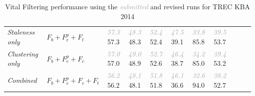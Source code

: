 \documentclass{article}
\newcommand{\sub}[1]{\textcolor{darkgray}{\sl #1}}
\begin{document}
\begin{table}[tb]
{\begin{center}
\begin{tabular}{llccccccccc}
{\textit{Staleness only}} & $F_b+F_e^p+F_t$ & 
  \sub{57.3} \hspace{1mm} 57.3 & \sub{48.3} \hspace{1mm} 48.3 & \sub{52.4} \hspace{1mm} 52.4 &
  \sub{47.5} \hspace{1mm} 39.1 & \sub{33.8} \hspace{1mm} 85.8 & \sub{39.5} \hspace{1mm} 53.7 \\
{\textit{Clustering only}} & $F_b+F_e^p+F_c$ & 
  \sub{57.0} \hspace{1mm} 57.0 & \sub{49.0} \hspace{1mm} 48.9 & \sub{52.7} \hspace{1mm} 52.6 &
  \sub{46.4} \hspace{1mm} 38.7 & \sub{34.2} \hspace{1mm} 85.0 & \sub{39.4} \hspace{1mm} 53.2 \\
{\textit{Combined}} & $F_b+F_e^p+F_c+F_t$ &
  \sub{56.2} \hspace{1mm} 56.2 & \sub{48.1} \hspace{1mm} 48.1 & \sub{51.8} \hspace{1mm} 51.8 &
  \sub{46.1} \hspace{1mm} 36.6 & \sub{32.6} \hspace{1mm} 94.0 & \sub{38.2} \hspace{1mm} 52.7 \\
 
\bottomrule
\end{tabular}
\end{center}
}
\caption{Vital Filtering performance using the \sub{submitted} and revised runs for TREC KBA 2014}
\label{officialRes}
\end{table}
\end{document}

